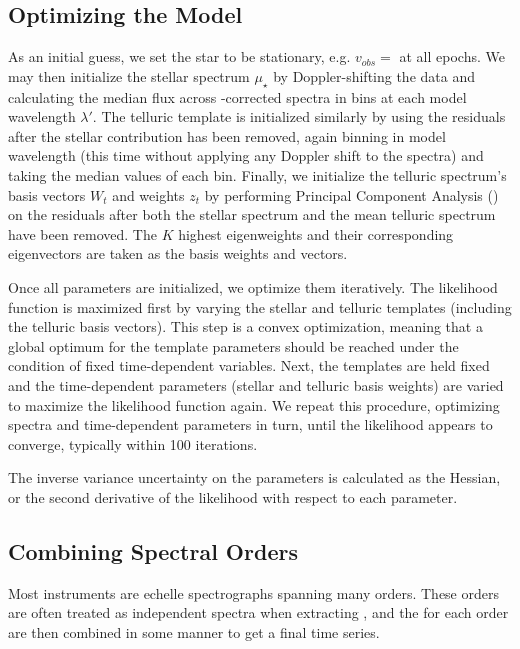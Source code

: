 \documentclass[modern]{aastex62}
\begin{document}
\subsection{Optimizing the Model}
\label{s:optimizing}

As an initial guess, we set the star to be stationary, e.g. $v_{obs} = $ \BERV at all epochs.
We may then initialize the stellar spectrum $\mu_{\star}$ by Doppler-shifting the data and calculating the median flux across \BERV-corrected spectra in bins at each model wavelength $\lambda'$.
The telluric template is initialized similarly by using the residuals after the stellar contribution has been removed, again binning in model wavelength (this time without applying any Doppler shift to the spectra) and taking the median values of each bin.
Finally, we initialize the telluric spectrum's basis vectors $W_t$ and weights $z_t$ by performing Principal Component Analysis () on the residuals after both the stellar spectrum and the mean telluric spectrum have been removed.
The $K$ highest eigenweights and their corresponding eigenvectors are taken as the basis weights and vectors.

Once all parameters are initialized, we optimize them iteratively.
The likelihood function is maximized first by varying the stellar and telluric templates (including the telluric basis vectors).
This step is a convex optimization, meaning that a global optimum for the template parameters should be reached under the condition of fixed time-dependent variables.
Next, the templates are held fixed and the time-dependent parameters (stellar \RVs and telluric basis weights) are varied to maximize the likelihood function again.
We repeat this procedure, optimizing spectra and time-dependent parameters in turn, until the likelihood appears to converge, typically within 100 iterations.

The inverse variance uncertainty on the parameters is calculated as the Hessian, or the second derivative of the likelihood with respect to each parameter. 

\subsection{Combining Spectral Orders}
\label{s:combining-orders}

Most \EPRV instruments are echelle spectrographs spanning many orders.
These orders are often treated as independent spectra when extracting \RVs, and the \RVs for each order are then combined in some manner to get a final time series.
\end{document}
